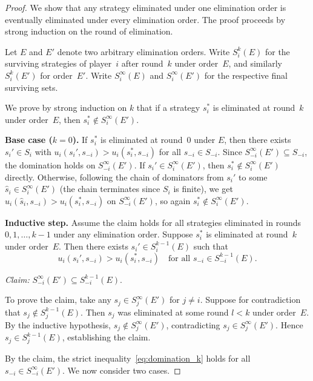 \documentclass[11pt,a4paper]{article}
\begin{document}
\begin{proof}
We show that any strategy eliminated under one elimination order is
eventually eliminated under every elimination order.  The proof proceeds by
strong induction on the round of elimination.

Let $E$ and $E'$ denote two arbitrary elimination orders.  Write $S_i^k(E)$
for the surviving strategies of player~$i$ after round~$k$ under order~$E$,
and similarly $S_i^k(E')$ for order~$E'$.  Write $S_i^\infty(E)$ and
$S_i^\infty(E')$ for the respective final surviving sets.

We prove by strong induction on $k$ that if a strategy $s_i^*$ is eliminated
at round~$k$ under order~$E$, then $s_i^* \notin S_i^\infty(E')$.

\medskip
\noindent\textbf{Base case ($k = 0$).}
If $s_i^*$ is eliminated at round~$0$ under $E$, then there exists
$s_i' \in S_i$ with $u_i(s_i', s_{-i}) > u_i(s_i^*, s_{-i})$ for all
$s_{-i} \in S_{-i}$.  Since $S_{-i}^\infty(E') \subseteq S_{-i}$, the
domination holds on $S_{-i}^\infty(E')$.  If $s_i' \in S_i^\infty(E')$,
then $s_i^* \notin S_i^\infty(E')$ directly.  Otherwise, following the
chain of dominators from $s_i'$ to some $\hat{s}_i \in S_i^\infty(E')$
(the chain terminates since $S_i$ is finite), we get
$u_i(\hat{s}_i, s_{-i}) > u_i(s_i^*, s_{-i})$ on $S_{-i}^\infty(E')$,
so again $s_i^* \notin S_i^\infty(E')$.

\medskip
\noindent\textbf{Inductive step.}
Assume the claim holds for all strategies eliminated in rounds
$0, 1, \ldots, k-1$ under any elimination order.  Suppose $s_i^*$ is
eliminated at round~$k$ under order~$E$.  Then there exists
$s_i' \in S_i^{k-1}(E)$ such that
\begin{equation}
\label{eq:domination_k}
    u_i(s_i', s_{-i}) > u_i(s_i^*, s_{-i})
    \quad \text{for all } s_{-i} \in S_{-i}^{k-1}(E).
\end{equation}

\emph{Claim:} $S_{-i}^\infty(E') \subseteq S_{-i}^{k-1}(E)$.

To prove the claim, take any $s_j \in S_j^\infty(E')$ for $j \neq i$.
Suppose for contradiction that $s_j \notin S_j^{k-1}(E)$.  Then $s_j$ was
eliminated at some round $l < k$ under order~$E$.  By the inductive
hypothesis, $s_j \notin S_j^\infty(E')$, contradicting
$s_j \in S_j^\infty(E')$.  Hence $s_j \in S_j^{k-1}(E)$, establishing the
claim.

By the claim, the strict inequality~\eqref{eq:domination_k} holds for all
$s_{-i} \in S_{-i}^\infty(E')$.  We now consider two cases.


\end{proof}
\end{document}
